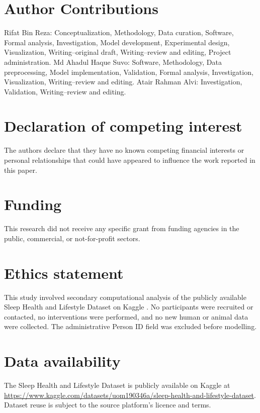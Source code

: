 \documentclass[a4paper,fleqn]{cas-dc}
\begin{document}
\section*{Author Contributions}

Rifat Bin Reza: Conceptualization, Methodology, Data curation, Software, Formal analysis, Investigation, Model development, Experimental design, Visualization, Writing--original draft, Writing--review and editing, Project administration. Md Ahadul Haque Suvo: Software, Methodology, Data preprocessing, Model implementation, Validation, Formal analysis, Investigation, Visualization, Writing--review and editing. Atair Rahman Alvi: Investigation, Validation, Writing--review and editing.



\section*{Declaration of competing interest}

The authors declare that they have no known competing financial interests or personal relationships that could have appeared to influence the work reported in this paper.

\section*{Funding}

This research did not receive any specific grant from funding agencies in the public, commercial, or not-for-profit sectors.

\section*{Ethics statement}

This study involved secondary computational analysis of the publicly available Sleep Health and Lifestyle Dataset on Kaggle \cite{kaggle2023}. No participants were recruited or contacted, no interventions were performed, and no new human or animal data were collected. The administrative Person ID field was excluded before modelling.

\section*{Data availability}

The Sleep Health and Lifestyle Dataset is publicly available on Kaggle at \url{https://www.kaggle.com/datasets/uom190346a/sleep-health-and-lifestyle-dataset}. Dataset reuse is subject to the source platform's licence and terms.
\end{document}
